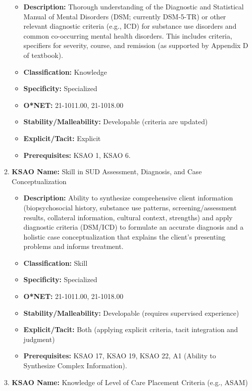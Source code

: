 \documentclass[
  letterpaper,
  DIV=11,
  numbers=noendperiod]{scrartcl}
\providecommand{\tightlist}{%
  \setlength{\itemsep}{0pt}\setlength{\parskip}{0pt}}
\begin{document}
\begin{enumerate}
  \begin{itemize}
  \tightlist
  \item
    \textbf{Description:} Thorough understanding of the Diagnostic and
    Statistical Manual of Mental Disorders (DSM; currently DSM-5-TR) or
    other relevant diagnostic criteria (e.g., ICD) for substance use
    disorders and common co-occurring mental health disorders. This
    includes criteria, specifiers for severity, course, and remission
    (as supported by Appendix D of textbook).
  \item
    \textbf{Classification:} Knowledge
  \item
    \textbf{Specificity:} Specialized
  \item
    \textbf{O*NET:} 21-1011.00, 21-1018.00
  \item
    \textbf{Stability/Malleability:} Developable (criteria are updated)
  \item
    \textbf{Explicit/Tacit:} Explicit
  \item
    \textbf{Prerequisites:} KSAO 1, KSAO 6.
  \end{itemize}
\item
  \textbf{KSAO Name:} Skill in SUD Assessment, Diagnosis, and Case
  Conceptualization

  \begin{itemize}
  \tightlist
  \item
    \textbf{Description:} Ability to synthesize comprehensive client
    information (biopsychosocial history, substance use patterns,
    screening/assessment results, collateral information, cultural
    context, strengths) and apply diagnostic criteria (DSM/ICD) to
    formulate an accurate diagnosis and a holistic case
    conceptualization that explains the client's presenting problems and
    informs treatment.
  \item
    \textbf{Classification:} Skill
  \item
    \textbf{Specificity:} Specialized
  \item
    \textbf{O*NET:} 21-1011.00, 21-1018.00
  \item
    \textbf{Stability/Malleability:} Developable (requires supervised
    experience)
  \item
    \textbf{Explicit/Tacit:} Both (applying explicit criteria, tacit
    integration and judgment)
  \item
    \textbf{Prerequisites:} KSAO 17, KSAO 19, KSAO 22, A1 (Ability to
    Synthesize Complex Information).
  \end{itemize}
\item
  \textbf{KSAO Name:} Knowledge of Level of Care Placement Criteria
  (e.g., ASAM)


\end{enumerate}
\end{document}
